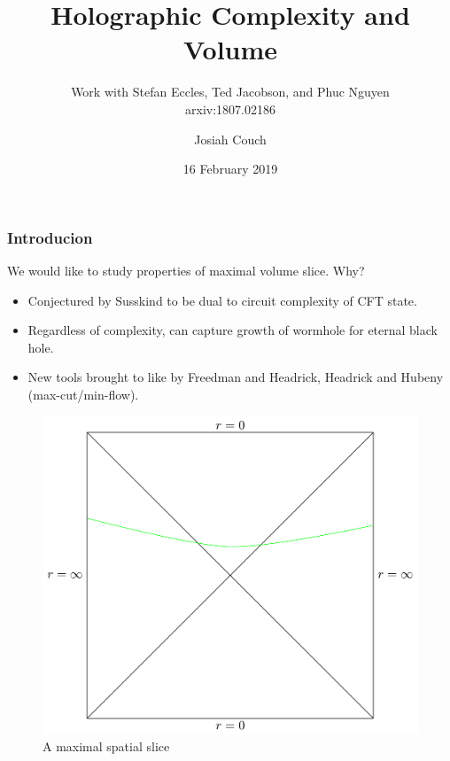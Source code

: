 \documentclass[8pt,aspectratio=169]{beamer}
\title{Holographic Complexity and Volume}
\subtitle{Work with Stefan Eccles, Ted Jacobson, and Phuc Nguyen\\ arxiv:1807.02186}
\author{Josiah Couch}
\institute{University of Texas at Austin}
\date{16 February 2019}
\begin{document}
\begin{frame}
\titlepage

\end{frame}

\begin{frame}
\frametitle{Introducion}

\begin{minipage}[t]{0.44\linewidth}

We would like to study properties of maximal volume slice. Why?

\begin{itemize}

\item Conjectured by Susskind to be dual to circuit complexity of CFT state.

\item Regardless of complexity, can capture growth of wormhole for eternal black hole.

\item New tools brought to like by Freedman and Headrick, Headrick and Hubeny (max-cut/min-flow). 

\end{itemize}

\end{minipage}\hfill
%
\begin{minipage}[t]{0.55\linewidth}

\begin{figure}
    \begin{center}
    
        \includegraphics[scale=0.35]{CV}    
    
    \end{center}
    \caption{A maximal spatial slice}
    \label{fig:WDW}
\end{figure}

\end{minipage}

\end{frame}
\end{document}
